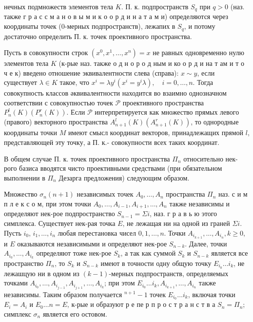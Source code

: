 \documentclass[10pt]{article}
\begin{document}
нечных подмножеств элементов тела $K$. П. к. подпространств $S_{q}$ при $q>0$ (наз. также г р а с с м а н о в ы м и к о о р д и н а т а м и) определяются через координаты точек (0-мерных подпространств), лежапих в $S_{q}$, и потому достаточно определить П. к. точек проективного пространства.



Пусть в совокупности строк $\left(x^{0}, x^{1}, \ldots, x^{n}\right)=x$ не равных одновременно нулю элементов тела $K$ (к-рые наз. также о д н о р о д ным и ко о р д и на т ам и т о ч е к) введено отношение эквивалентности слева (справа): $x \sim y$, если существует $\lambda \in K$ такое, что $x^{i}=\lambda y^{i}\left(x^{i}=y^{i} \lambda\right), \quad i=0, \ldots, n$. Тогда совокупность классов әквивалентности находится во взаимно однозначном соответствии с совокупностью точек $\mathscr{P}$ проективного пространства $P_{n}^{l}(K)\left(P_{n}^{r}(K)\right)$. Если $\mathscr{P}$ интерпретируется как множество прямых левого (правого) векторного пространства $A_{n+1}^{l}(K)\left(A_{n+1}^{r}(K)\right)$, то однородные координаты точки $M$ имеют смысл координат векторов, принадлежащих прямой $l$, представляющей эту точку, а П. к.- совокупности всех таких координат.



В общем случае П. к. точек проективного пространства $\Pi_{n}$ относительно нек-рого базиса вводятся чисто проективными средствами (при обязательном выполнении в $\Pi_{n}$ Дезарга предложения) следующим образом.



Множество $\sigma_{n}(n+1)$ независимых точек $A_{0}, \ldots, A_{n}$ пространства $\Pi_{n}$ наз. с и м п л е к с о м, при этом точки $A_{0}, \ldots, A_{i-1}, A_{i+1}, \ldots, A_{n}$ также независимы и определяют нек-рое подпространство $S_{n-1}=\Sigma i$, наз. г р а в ь ю этого симплекса. Существует нек-рая точка $E$, не лежащая ни на одной из граней $\Sigma i$. Пусть $i_{0}$, $i_{1}, \ldots, i_{n}$ любая перестановка чисел $0,1, \ldots, n$. Точки $A_{i_{k+1}}, \ldots, A_{i_{n}}, k \geqslant 0$, и $E$ оказываются независимыми и определяют нек-рое $S_{n-k}$. Далее, точки $A_{i_{0}}, \ldots, A_{i_{k}}$ определяют тоже нек-рое $S_{k}$, а так как суммой $S_{k}$ и $S_{n-k}$ является все пространство $\Pi_{n}$, то $S_{k}$ и $S_{n-k}$ имеют в точности одну общую точку $E_{i_{0}} \ldots i_{k}$, не лежашцую ни в одном из $(k-1)$-мерных подпространств, определяемых точками $A_{i_{0}}, \ldots, A_{i_{j-1}}, A_{i_{j+1}}, \ldots, A_{i_{k}}$; при этом $E_{i_{0}} \ldots i_{k}, A_{i_{k+1}}, \ldots, A_{i_{n}}$ также независимы. Таким образом получается ${ }^{n+1}-1$ точек $E_{i_{0}} \ldots i_{k}$, включая точки $E_{i}=A_{i}$ и $E_{0} \ldots n=E$, к-рые и образуют р е пе р п р о с т р а н с т в а $S_{n}=\Pi_{n}$; симплекс $\sigma_{n}$ является его остовом.
\end{document}
